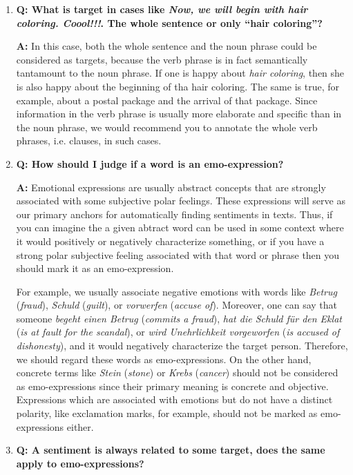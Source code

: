 \documentclass[11pt,a4paper]{article}
\theoremstyle{mytheoremstyle}
\begin{document}
\begin{enumerate}
\item\textbf{Q: What is target in cases like \textit{Now, we will
    begin with hair coloring.  Coool!!!}.  The whole sentence or only
  ``hair coloring''?}

\textbf{A:} In this case, both the whole sentence and the noun phrase
could be considered as targets, because the verb phrase is in fact
semantically tantamount to the noun phrase.  If one is happy about
\textit{hair coloring}, then she is also happy about the beginning of
tha hair coloring.  The same is true, for example, about a postal
package and the arrival of that package.  Since information in the
verb phrase is usually more elaborate and specific than in the noun
phrase, we would recommend you to annotate the whole verb phrases,
i.e. clauses, in such cases.

\item\textbf{Q: How should I judge if a word is an emo-expression?}

\textbf{A:} Emotional expressions are usually abstract concepts that
are strongly associated with some subjective polar feelings.  These
expressions will serve as our primary anchors for automatically
finding sentiments in texts.  Thus, if you can imagine the a given
abtract word can be used in some context where it would positively or
negatively characterize something, or if you have a strong polar
subjective feeling associated with that word or phrase then you should
mark it as an emo-expression.

For example, we usually associate negative emotions with words like
\textit{Betrug} (\textit{fraud}), \textit{Schuld} (\textit{guilt}), or
\textit{vorwerfen} (\textit{accuse of}).  Moreover, one can say that
someone \textit{begeht einen Betrug} (\textit{commits a fraud}),
\textit{hat die Schuld f\"ur den Eklat} (\textit{is at fault for the
  scandal}), or \textit{wird Unehrlichkeit vorgeworfen} (\textit{is
  accused of dishonesty}), and it would negatively characterize the
target person.  Therefore, we should regard these words as
emo-expressions.  On the other hand, concrete terms like
\textit{Stein} (\textit{stone}) or \textit{Krebs} (\textit{cancer})
should not be considered as emo-expressions since their primary
meaning is concrete and objective.  Expressions which are associated
with emotions but do not have a distinct polarity, like exclamation
marks, for example, should not be marked as emo-expressions either.

\item\textbf{Q: A sentiment is always related to some target, does the
  same apply to emo-expressions?}


\end{enumerate}
\end{document}
